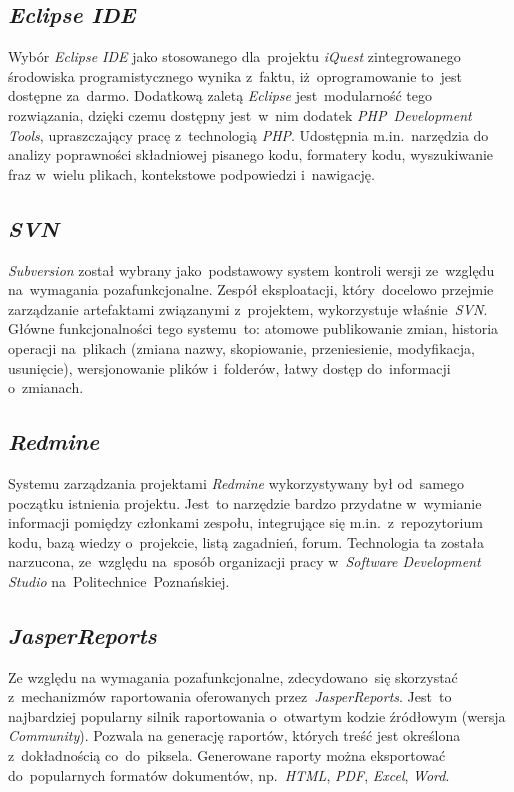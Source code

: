 \subsection{\textit{Eclipse IDE}}
\label{Chapter636}

Wybór \textit{Eclipse IDE} jako stosowanego dla~projektu \textit{iQuest} zintegrowanego środowiska programistycznego wynika z~faktu, iż~oprogramowanie to~jest dostępne za~darmo. Dodatkową zaletą \textit{Eclipse} jest~modularność tego rozwiązania, dzięki czemu dostępny jest~w~nim dodatek \textit{PHP~Development Tools}, upraszczający pracę z~technologią \textit{PHP}. Udostępnia m.in.~narzędzia do analizy poprawności składniowej pisanego kodu, formatery kodu, wyszukiwanie fraz w~wielu plikach, kontekstowe podpowiedzi i~nawigację.

\subsection{\textit{SVN}}
\label{Chapter637}

\textit{Subversion} został wybrany jako~podstawowy system kontroli wersji ze~względu na~wymagania pozafunkcjonalne. Zespół eksploatacji, który~docelowo przejmie zarządzanie artefaktami związanymi z~projektem, wykorzystuje właśnie~\textit{SVN}. Główne funkcjonalności tego systemu~to: atomowe publikowanie zmian, historia operacji na~plikach (zmiana nazwy, skopiowanie, przeniesienie, modyfikacja, usunięcie), wersjonowanie plików i~folderów, łatwy dostęp do~informacji o~zmianach.

\subsection{\textit{Redmine}}
\label{Chapter638}

Systemu zarządzania projektami \textit{Redmine} wykorzystywany był od~samego początku istnienia projektu. Jest~to narzędzie bardzo przydatne w~wymianie informacji pomiędzy członkami zespołu, integrujące się m.in.~z~repozytorium kodu, bazą wiedzy o~projekcie, listą zagadnień, forum. Technologia ta została narzucona, ze~względu na~sposób organizacji pracy w~\textit{Software Development Studio} na~Politechnice~Poznańskiej.

\subsection{\textit{JasperReports}}
\label{Chapter639}

Ze względu na wymagania pozafunkcjonalne, zdecydowano~się skorzystać z~mechanizmów raportowania oferowanych przez~\textit{JasperReports}. Jest~to najbardziej popularny silnik raportowania o~otwartym kodzie źródłowym (wersja \textit{Community}). Pozwala na generację raportów, których treść jest określona z~dokładnością co~do~piksela. Generowane raporty można eksportować do~popularnych formatów dokumentów, np.~\textit{HTML}, \textit{PDF}, \textit{Excel}, \textit{Word}.

